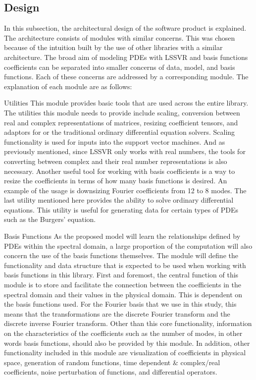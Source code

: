 \subsection{Design}\label{sec:implementation_design}
\noindent In this subsection, the architectural design of the software product is explained. The architecture consists of modules with similar concerns. This was chosen because of the intuition built by the use of other libraries with a similar architecture. The broad aim of modeling PDEs with LSSVR and basis functions coefficients can be separated into smaller concerns of data, model, and basis functions. Each of these concerns are addressed by a corresponding module. The explanation of each module are as follows:
\begin{numdesc}
  \item[Utilities]
  This module provides basic tools that are used across the entire library. The utilities this module needs to provide include scaling, conversion between real and complex representations of matrices, resizing coefficient tensors, and adaptors for or the traditional ordinary differential equation solvers. Scaling functionality is used for inputs into the support vector machines. And as previously mentioned, since LSSVR only works with real numbers, the tools for converting between complex and their real number representations is also necessary. Another useful tool for working with basis coefficients is a way to resize the coefficients in terms of how many basis functions is desired. An example of the usage is downsizing Fourier coefficients from 12 to 8 modes. The last utility mentioned here provides the ability to solve ordinary differential equations. This utility is useful for generating data for certain types of PDEs such as the Burgers' equation.

  \item[Basis Functions]
  As the proposed model will learn the relationships defined by PDEs within the spectral domain, a large proportion of the computation will also concern the use of the basis functions themselves. The module will define the functionality and data structure that is expected to be used when working with basis functions in this library. First and foremost, the central function of this module is to store and facilitate the connection between the coefficients in the spectral domain and their values in the physical domain. This is dependent on the basis functions used. For the Fourier basis that we use in this study, this means that the transformations are the discrete Fourier transform and the discrete inverse Fourier transform. Other than this core functionality, information on the characteristics of the coefficients such as the number of modes, in other words basis functions, should also be provided by this module. In addition, other functionality included in this module are visualization of coefficients in physical space, generation of random functions, time dependent \& complex/real coefficients, noise perturbation of functions, and differential operators.


\end{numdesc}
